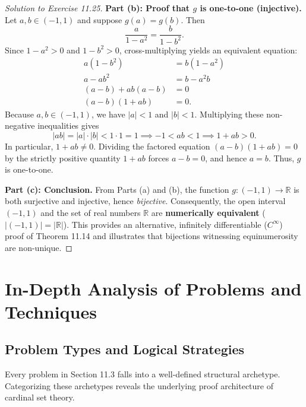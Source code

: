 \documentclass[11pt, letterpaper]{article}
\theoremstyle{definition}
\theoremstyle{remark}
\begin{document}
\begin{proof}[Solution to Exercise 11.25]
\medskip
\textbf{Part (b): Proof that $g$ is one-to-one (injective).} Let $a, b \in (-1, 1)$ and suppose $g(a) = g(b)$. Then
\[
\frac{a}{1 - a^2} = \frac{b}{1 - b^2}.
\]
Since $1 - a^2 > 0$ and $1 - b^2 > 0$, cross-multiplying yields an equivalent equation:
\begin{align*}
a(1 - b^2) &= b(1 - a^2) \\
a - ab^2 &= b - a^2 b \\
(a - b) + ab(a - b) &= 0 \\
(a - b)(1 + ab) &= 0.
\end{align*}
Because $a, b \in (-1, 1)$, we have $|a| < 1$ and $|b| < 1$. Multiplying these non-negative inequalities gives
\[
|ab| = |a|\cdot|b| < 1 \cdot 1 = 1 \implies -1 < ab < 1 \implies 1 + ab > 0.
\]
In particular, $1 + ab \neq 0$. Dividing the factored equation $(a - b)(1 + ab) = 0$ by the strictly positive quantity $1 + ab$ forces $a - b = 0$, and hence $a = b$. Thus, $g$ is one-to-one.

\medskip
\textbf{Part (c): Conclusion.} From Parts (a) and (b), the function $g : (-1, 1) \to \mathbb{R}$ is both surjective and injective, hence \emph{bijective}. Consequently, the open interval $(-1, 1)$ and the set of real numbers $\mathbb{R}$ are \textbf{numerically equivalent} ($|(-1, 1)| = |\mathbb{R}|$). This provides an alternative, infinitely differentiable ($C^\infty$) proof of Theorem 11.14 and illustrates that bijections witnessing equinumerosity are non-unique.
\end{proof}

\section{In-Depth Analysis of Problems and Techniques}

\subsection{Problem Types and Logical Strategies}

Every problem in Section 11.3 falls into a well-defined structural archetype. Categorizing these archetypes reveals the underlying proof architecture of cardinal set theory.
\end{document}
